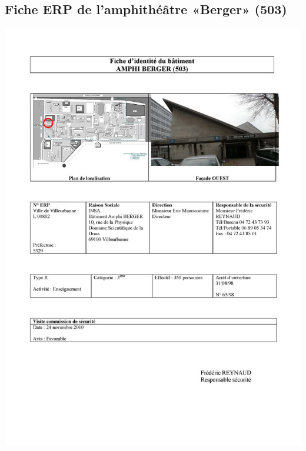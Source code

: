 \documentclass[hidelinks, paper=a4, fontsize=13pt]{report}
\begin{document}
\subsection{Fiche ERP de l’amphithéâtre «Berger» (503)}
\begin{center}
\includegraphics[scale=0.5]{Annexes/Documents/ERPBerger}
\end{center}
\end{document}
